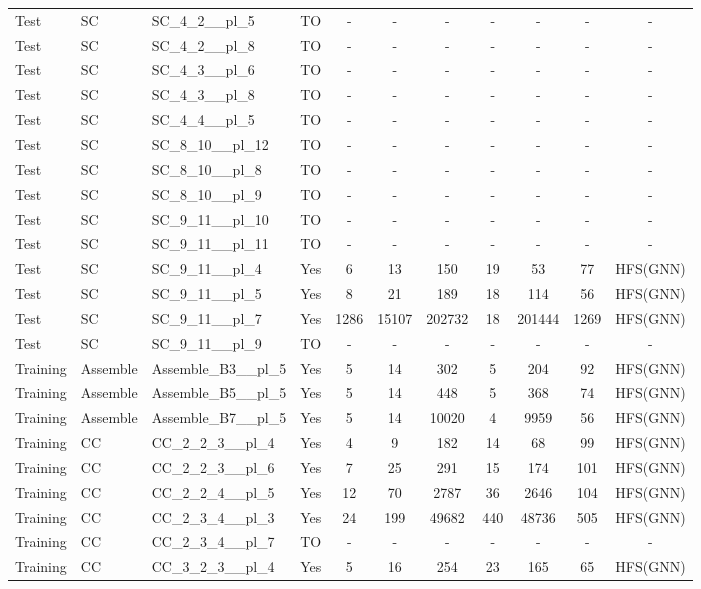 \documentclass{article}
\begin{document}
\begin{tabular}{lllcccccccc}
Test & SC & SC\_4\_2\_\_pl\_5 & TO & - & - & - & - & - & - & - \\
Test & SC & SC\_4\_2\_\_pl\_8 & TO & - & - & - & - & - & - & - \\
Test & SC & SC\_4\_3\_\_pl\_6 & TO & - & - & - & - & - & - & - \\
Test & SC & SC\_4\_3\_\_pl\_8 & TO & - & - & - & - & - & - & - \\
Test & SC & SC\_4\_4\_\_pl\_5 & TO & - & - & - & - & - & - & - \\
Test & SC & SC\_8\_10\_\_pl\_12 & TO & - & - & - & - & - & - & - \\
Test & SC & SC\_8\_10\_\_pl\_8 & TO & - & - & - & - & - & - & - \\
Test & SC & SC\_8\_10\_\_pl\_9 & TO & - & - & - & - & - & - & - \\
Test & SC & SC\_9\_11\_\_pl\_10 & TO & - & - & - & - & - & - & - \\
Test & SC & SC\_9\_11\_\_pl\_11 & TO & - & - & - & - & - & - & - \\
Test & SC & SC\_9\_11\_\_pl\_4 & Yes & 6 & 13 & 150 & 19 & 53 & 77 & HFS(GNN) \\
Test & SC & SC\_9\_11\_\_pl\_5 & Yes & 8 & 21 & 189 & 18 & 114 & 56 & HFS(GNN) \\
Test & SC & SC\_9\_11\_\_pl\_7 & Yes & 1286 & 15107 & 202732 & 18 & 201444 & 1269 & HFS(GNN) \\
Test & SC & SC\_9\_11\_\_pl\_9 & TO & - & - & - & - & - & - & - \\
Training & Assemble & Assemble\_B3\_\_pl\_5 & Yes & 5 & 14 & 302 & 5 & 204 & 92 & HFS(GNN) \\
Training & Assemble & Assemble\_B5\_\_pl\_5 & Yes & 5 & 14 & 448 & 5 & 368 & 74 & HFS(GNN) \\
Training & Assemble & Assemble\_B7\_\_pl\_5 & Yes & 5 & 14 & 10020 & 4 & 9959 & 56 & HFS(GNN) \\
Training & CC & CC\_2\_2\_3\_\_pl\_4 & Yes & 4 & 9 & 182 & 14 & 68 & 99 & HFS(GNN) \\
Training & CC & CC\_2\_2\_3\_\_pl\_6 & Yes & 7 & 25 & 291 & 15 & 174 & 101 & HFS(GNN) \\
Training & CC & CC\_2\_2\_4\_\_pl\_5 & Yes & 12 & 70 & 2787 & 36 & 2646 & 104 & HFS(GNN) \\
Training & CC & CC\_2\_3\_4\_\_pl\_3 & Yes & 24 & 199 & 49682 & 440 & 48736 & 505 & HFS(GNN) \\
Training & CC & CC\_2\_3\_4\_\_pl\_7 & TO & - & - & - & - & - & - & - \\
Training & CC & CC\_3\_2\_3\_\_pl\_4 & Yes & 5 & 16 & 254 & 23 & 165 & 65 & HFS(GNN) \\

\end{tabular}
\end{document}
